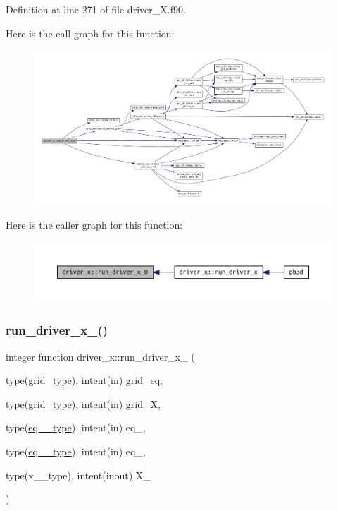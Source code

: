 Definition at line 271 of file driver\+\_\+\+X.\+f90.

Here is the call graph for this function\+:\nopagebreak
\begin{figure}[H]
\begin{center}
\leavevmode
\includegraphics[width=350pt]{namespacedriver__x_a2b82a9bc6c0f4af9f3468d03fedc008e_cgraph}
\end{center}
\end{figure}
Here is the caller graph for this function\+:\nopagebreak
\begin{figure}[H]
\begin{center}
\leavevmode
\includegraphics[width=350pt]{namespacedriver__x_a2b82a9bc6c0f4af9f3468d03fedc008e_icgraph}
\end{center}
\end{figure}
\mbox{\label{namespacedriver__x_a454779cefa6da3714d32eedcec0ef7de}} 
\subsubsection{\texorpdfstring{run\+\_\+driver\+\_\+x\+\_()}{run\_driver\_x\_1()}}
{\footnotesize\ttfamily integer function driver\+\_\+x\+::run\+\_\+driver\+\_\+x\+\_ (\begin{DoxyParamCaption}\item[{type(\hyperlink{structgrid__vars_1_1grid__type}{grid\+\_\+type}), intent(in)}]{grid\+\_\+eq,  }\item[{type(\hyperlink{structgrid__vars_1_1grid__type}{grid\+\_\+type}), intent(in)}]{grid\+\_\+X,  }\item[{type(\hyperlink{structeq__vars_1_1eq__1__type}{eq\+\_\+1\+\_\+type}), intent(in)}]{eq\+\_,  }\item[{type(\hyperlink{structeq__vars_1_1eq__2__type}{eq\+\_\+2\+\_\+type}), intent(in)}]{eq\+\_,  }\item[{type(x\+\_\+1\+\_\+type), intent(inout)}]{X\+\_ }\end{DoxyParamCaption})}



